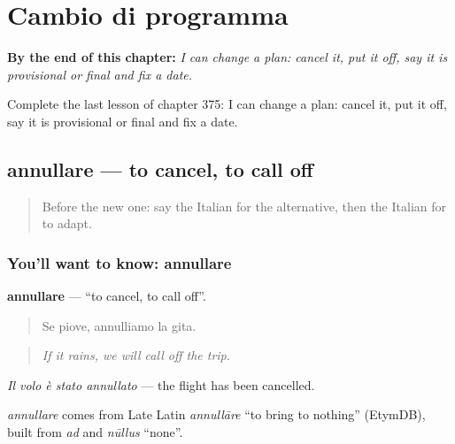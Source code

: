 
\chapter{Cambio di programma}
\label{ch:it-cambio-di-programma}

\begin{chapteropening}
\textbf{By the end of this chapter:} \emph{I can change a plan: cancel it, put it off, say it is provisional or final and fix a date.}

Complete the last lesson of chapter 375: I can change a plan: cancel it, put it off, say it is provisional or final and fix a date.
\end{chapteropening}

\section[annullare]{annullare — to cancel, to call off}

\label{lesson:IT-C375-annullare}



\begin{quote}
Before the new one: say the Italian for the alternative, then the Italian for to adapt.
\end{quote}

\subsection*{You'll want to know: annullare}
\textbf{annullare} — \textquotedblleft{}to cancel, to call off\textquotedblright{}.

\begin{quote}
Se piove, annulliamo la gita.
\end{quote}

\begin{quote}
\emph{If it rains, we will call off the trip.}
\end{quote}

\emph{Il volo è stato annullato} — the flight has been cancelled.

\begin{cousinweb}
\emph{annullare} comes from Late Latin \emph{annullāre} \textquotedblleft{}to bring to nothing\textquotedblright{} (EtymDB), built from \emph{ad} and \emph{nūllus} \textquotedblleft{}none\textquotedblright{}.
\end{cousinweb}

